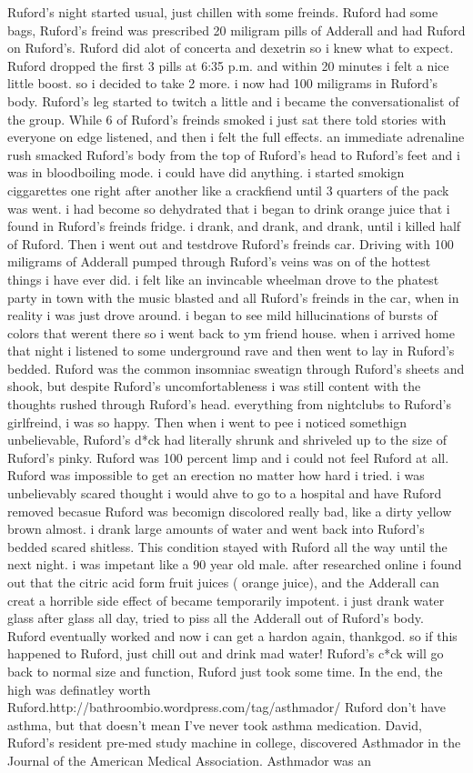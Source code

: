 \documentclass[12pt]{book}
\begin{document}
Ruford's night started usual, just chillen with some freinds. Ruford had some bags, Ruford's freind was prescribed 20 miligram pills of Adderall and had Ruford on Ruford's. Ruford did alot of concerta and dexetrin so i knew what to expect. Ruford dropped the first 3 pills at 6:35 p.m. and within 20 minutes i felt a nice little boost. so i decided to take 2 more. i now had 100 miligrams in Ruford's body. Ruford's leg started to twitch a little and i became the conversationalist of the group. While 6 of Ruford's freinds smoked i just sat there told stories with everyone on edge listened, and then i felt the full effects. an immediate adrenaline rush smacked Ruford's body from the top of Ruford's head to Ruford's feet and i was in bloodboiling mode. i could have did anything. i started smokign ciggarettes one right after another like a crackfiend until 3 quarters of the pack was went. i had become so dehydrated that i began to drink orange juice that i found in Ruford's freinds fridge. i drank, and drank, and drank, until i killed half of Ruford. Then i went out and testdrove Ruford's freinds car. Driving with 100 miligrams of Adderall pumped through Ruford's veins was on of the hottest things i have ever did. i felt like an invincable wheelman drove to the phatest party in town with the music blasted and all Ruford's freinds in the car, when in reality i was just drove around. i began to see mild hillucinations of bursts of colors that werent there so i went back to ym friend house. when i arrived home that night i listened to some underground rave and then went to lay in Ruford's bedded. Ruford was the common insomniac sweatign through Ruford's sheets and shook, but despite Ruford's uncomfortableness i was still content with the thoughts rushed through Ruford's head. everything from nightclubs to Ruford's girlfreind, i was so happy. Then when i went to pee i noticed somethign unbelievable, Ruford's d*ck had literally shrunk and shriveled up to the size of Ruford's pinky. Ruford was 100 percent limp and i could not feel Ruford at all. Ruford was impossible to get an erection no matter how hard i tried. i was unbelievably scared thought i would ahve to go to a hospital and have Ruford removed becasue Ruford was becomign discolored really bad, like a dirty yellow brown almost. i drank large amounts of water and went back into Ruford's bedded scared shitless. This condition stayed with Ruford all the way until the next night. i was impetant like a 90 year old male. after researched online i found out that the citric acid form fruit juices ( orange juice), and the Adderall can creat a horrible side effect of became temporarily impotent. i just drank water glass after glass all day, tried to piss all the Adderall out of Ruford's body. Ruford eventually worked and now i can get a hardon again, thankgod. so if this happened to Ruford, just chill out and drink mad water! Ruford's c*ck will go back to normal size and function, Ruford just took some time. In the end, the high was definatley worth Ruford.http://bathroombio.wordpress.com/tag/asthmador/ Ruford don't have asthma, but that doesn't mean I've never took asthma medication. David, Ruford's resident pre-med study machine in college, discovered Asthmador in the Journal of the American Medical Association. Asthmador was an 
\end{document}
